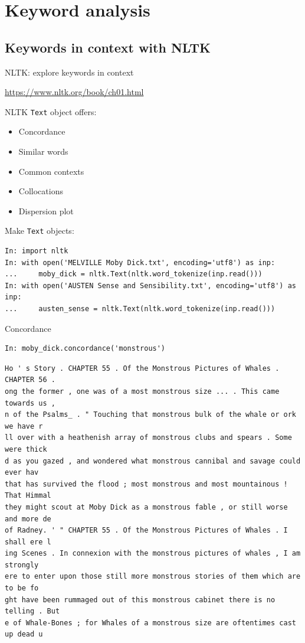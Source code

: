 \documentclass[aspectratio=169,usenames,dvipsnames]{beamer}
\begin{document}
\section{Keyword analysis}
\subsection{Keywords in context with NLTK}
\frame{\tableofcontents[currentsection]}

\begin{frame}[fragile]{NLTK: explore keywords in context}
    \begin{reference}
        \url{https://www.nltk.org/book/ch01.html}
    \end{reference}
    NLTK \texttt{Text} object offers:
    \begin{itemize}
        \item Concordance
        \item Similar words
        \item Common contexts
        \item Collocations
        \item Dispersion plot
    \end{itemize}
Make \texttt{Text} objects:
\begin{lstlisting}
In: import nltk
In: with open('MELVILLE Moby Dick.txt', encoding='utf8') as inp:
...     moby_dick = nltk.Text(nltk.word_tokenize(inp.read()))
In: with open('AUSTEN Sense and Sensibility.txt', encoding='utf8') as inp:
...     austen_sense = nltk.Text(nltk.word_tokenize(inp.read()))
\end{lstlisting}
\end{frame}

\begin{frame}[fragile]{Concordance}
\begin{lstlisting}
In: moby_dick.concordance('monstrous')
\end{lstlisting}
\begin{lstlisting}[style=plainsmaller]
Ho ' s Story . CHAPTER 55 . Of the Monstrous Pictures of Whales . CHAPTER 56 .
ong the former , one was of a most monstrous size ... . This came towards us ,
n of the Psalms_ . " Touching that monstrous bulk of the whale or ork we have r
ll over with a heathenish array of monstrous clubs and spears . Some were thick
d as you gazed , and wondered what monstrous cannibal and savage could ever hav
that has survived the flood ; most monstrous and most mountainous ! That Himmal
they might scout at Moby Dick as a monstrous fable , or still worse and more de
of Radney. ' " CHAPTER 55 . Of the Monstrous Pictures of Whales . I shall ere l
ing Scenes . In connexion with the monstrous pictures of whales , I am strongly
ere to enter upon those still more monstrous stories of them which are to be fo
ght have been rummaged out of this monstrous cabinet there is no telling . But
e of Whale-Bones ; for Whales of a monstrous size are oftentimes cast up dead u
\end{lstlisting}
\end{frame}
\end{document}
